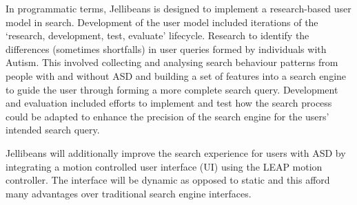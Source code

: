 \documentclass[a4paper, 11pt]{article}
\begin{document}
In programmatic terms, Jellibeans is designed to implement a research-based user model in search. Development of the user model included iterations of the `research, development, test, evaluate' lifecycle. Research to identify the differences (sometimes shortfalls) in user queries formed by individuals with Autism. This involved collecting and analysing search behaviour patterns from people with and without ASD and building a set of features into a search engine to guide the user through forming a more complete search query. Development and evaluation included efforts to implement and test how the search process could be adapted to enhance the precision of the search engine for the users' intended search query. 


Jellibeans will additionally improve the search experience for users with ASD by integrating a motion controlled user interface (UI) using the LEAP motion controller. The interface will be dynamic as opposed to static and this afford many advantages over traditional search engine interfaces.

\end{document}
